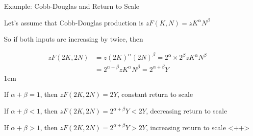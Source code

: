 \documentclass[11pt,aspectratio=43]{beamer} \usepackage[utf8]{inputenc}
\let\oldenumerate=\enumerate
\let\endoldenumerate=\endenumerate
\renewenvironment{enumerate}{\oldenumerate \itemsep1em}{ \endoldenumerate}
\theoremstyle{definition}
\begin{document}
\begin{frame}{Example: Cobb-Douglas and Return to Scale}
\label{slide:Example__Cobb_Douglas_and_Return_to_Scale}

Let's assume that Cobb-Douglas production is $ z F( K, N ) = z K^{\alpha} N^{\beta} $

So if both inputs are increasing by twice, then

%
\begin{align*}
    zF( 2K, 2N )
        & = z ( 2K )^{\alpha} ( 2N )^{\beta} = 2^{\alpha} \times 2^{\beta} z K^{\alpha} N^{\beta}
    \\
        & = 2^{\alpha+\beta} z K^{\alpha} N^{\beta} = 2^{\alpha+\beta} Y
\end{align*}
%
\begin{enumerate}
    \item If $ \alpha+\beta = 1 $, then $ zF( 2K, 2N ) = 2Y $, constant return to scale
    \item If $ \alpha+\beta < 1 $, then $ zF( 2K, 2N ) = 2^{\alpha+\beta}Y < 2Y $, decreasing return to scale
    \item If $ \alpha+\beta > 1 $, then $ zF( 2K, 2N ) = 2^{\alpha+\beta}Y > 2Y $, increasing return to scale
\end{enumerate}
<++>




\end{frame}
\end{document}
